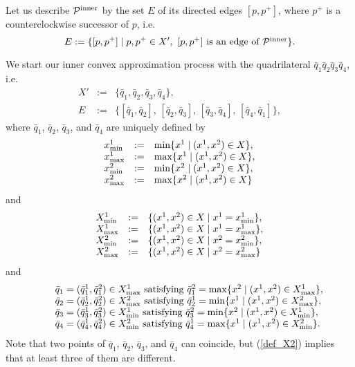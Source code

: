 \documentclass[12pt]{article}
\begin{document}
Let us describe ${\cal P}^{\rm inner}$ by the set $E$ of its directed edges $[p, p^+]$, where $p^+$ is a counterclockwise successor of $p$, i.e.
\begin{equation}\label{def_E}
E := \{[p, p^+] \mid p, p^+ \in X', \mbox{ $[p, p^+]$ is an edge of ${\cal P}^{\rm inner}$}\}.
\end{equation}


We start our inner convex approximation process with the quadrilateral $\bar q_1 \bar q_2 \bar q_3 \bar q_4$, i.e.
\begin{equation}\label{def_X'E}
\begin{array}{lcl}
X' &:=& \{\bar q_1, \bar q_2, \bar q_3, \bar q_4\}, \\
E &:=& \{[\bar q_1, \bar q_2], \, [\bar q_2, \bar q_3], \, [\bar q_3, \bar q_4], \, [\bar q_4, \bar q_1]\},
\end{array}
\end{equation}
where $\bar q_1$, $\bar q_2$, $\bar q_3$, and $\bar q_4$ are uniquely defined by
\begin{equation}\label{def_4barq1}
\begin{array}{lcl}
x^1_{\rm min} &:=& \min \{x^1 \mid (x^1, x^2) \in X\}, \\
x^1_{\rm max} &:=& \max \{x^1 \mid (x^1, x^2) \in X\}, \\
x^2_{\rm min} &:=& \min \{x^2 \mid (x^1, x^2) \in X\}, \\
x^2_{\rm max} &:=& \max \{x^2 \mid (x^1, x^2) \in X\}
\end{array}
\end{equation}
and 
\begin{equation}\label{def_4barq2}
\begin{array}{lcl}
X^1_{\rm min} &:=& \{(x^1, x^2) \in X \mid x^1 = x^1_{\rm min}\}, \\
X^1_{\rm max} &:=& \{(x^1, x^2) \in X \mid x^1 = x^1_{\rm max}\}, \\
X^2_{\rm min} &:=& \{(x^1, x^2) \in X \mid x^2 = x^2_{\rm min}\}, \\
X^2_{\rm max} &:=& \{(x^1, x^2) \in X \mid x^2 = x^2_{\rm max}\}
\end{array}
\end{equation}
and 
\begin{equation}\label{def_4barq3}
\begin{array}{lcl}
&& \bar q_1 = (\bar q_1^1, \bar q_1^2) \in X^1_{\rm max} \mbox{ satisfying } \bar q_1^2 = \max\{x^2 \mid (x^1, x^2) \in X^1_{\rm max}\}, \\
&& \bar q_2 = (\bar q_2^1, \bar q_2^2) \in X^2_{\rm max} \mbox{ satisfying } \bar q_2^1 = \min\{x^1 \mid (x^1, x^2) \in X^2_{\rm max}\}, \\
&& \bar q_3 = (\bar q_3^1, \bar q_3^2) \in X^1_{\rm min} \mbox{ satisfying } \bar q_3^2 = \min\{x^2 \mid (x^1, x^2) \in X^1_{\rm min}\}, \\
&& \bar q_4 = (\bar q_4^1, \bar q_4^2) \in X^2_{\rm min} \mbox{ satisfying } \bar q_4^1 = \max\{x^1 \mid (x^1, x^2) \in X^2_{\rm min}\}.
\end{array}
\end{equation}
Note that two points of $\bar q_1$, $\bar q_2$, $\bar q_3$, and $\bar q_4$ can coincide, but (\ref{def_X2}) implies that at least three of them are different.
\end{document}
